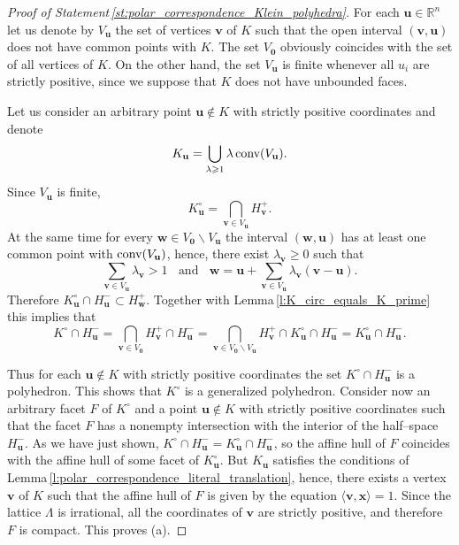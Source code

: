 \documentclass[11pt]{article}
\theoremstyle{definition}
\theoremstyle{remark}
\theoremstyle{plain}
\renewcommand{\vec}[1]{\mathbf{#1}}
\renewcommand{\geq}{\geqslant}
\newcommand{\conv}{\textup{conv}}
\newcommand{\La}{\Lambda}
\newcommand{\R}{\mathbb{R}}
\begin{document}
  \begin{proof}[Proof of Statement\,\ref{st:polar_correspondence_Klein_polyhedra}]
    For each $\vec u\in\R^n$ let us denote by $V_{\vec u}$ the set of vertices $\vec v$ of
    $K$ such that the open interval $(\vec v,\vec u)$ does not have common points with $K$.
    The set $V_{\vec 0}$ obviously coincides with the set of all vertices of $K$. On the
    other hand, the set $V_{\vec u}$ is finite whenever all $u_i$ are strictly positive,
    since we suppose that $K$ does not have unbounded faces.

    Let us consider an arbitrary point $\vec u\notin K$ with strictly positive coordinates
    and denote
    \[ K_{\vec u}=\bigcup_{\lambda\geq 1}\lambda\,\conv(V_{\vec u}). \]
    Since $V_{\vec u}$ is finite,
    \[ K_{\vec u}^\circ=\bigcap_{\vec v\in V_{\vec u}}H_{\vec v}^+. \]
    At the same time for every $\vec w\in V_{\vec 0}\backslash V_{\vec u}$ the interval
    $(\vec w,\vec u)$ has at least one common point with $\conv(V_{\vec u})$, hence, there
    exist $\lambda_{\vec v}\geq 0$ such that
    \[ \sum_{\vec v\in V_{\vec u}}\lambda_{\vec v}>1\ \ \ \ \text{and}\ \ \ \
       \vec w=\vec u+\sum_{\vec v\in V_{\vec u}}\lambda_{\vec v}(\vec v-\vec u). \]
    Therefore $ K_{\vec u}^\circ\cap H_{\vec u}^-\subset H_{\vec w}^+$. Together with
    Lemma\,\ref{l:K_circ_equals_K_prime} this implies that
    \[ K^\circ\cap H_{\vec u}^-=
       \bigcap_{\vec v\in V_{\vec 0}}H_{\vec v}^+\cap H_{\vec u}^-=
       \bigcap_{\vec v\in V_{\vec 0}\backslash V_{\vec u}}H_{\vec v}^+\cap
       K_{\vec u}^\circ\cap H_{\vec u}^-=
       K_{\vec u}^\circ\cap H_{\vec u}^-. \]

    Thus for each $\vec u\notin K$ with strictly positive coordinates the set
    $K^\circ\cap H_{\vec u}^-$ is a polyhedron. This shows that $K^\circ$ is a generalized
    polyhedron. Consider now an arbitrary facet $F$ of $K^\circ$ and a point $\vec u\notin K$
    with strictly positive coordinates such that the facet $F$ has a nonempty intersection
    with the interior of the half--space $H_{\vec u}^-$. As we have just shown,
    $K^\circ\cap H_{\vec u}^-=K_{\vec u}^\circ\cap H_{\vec u}^-$, so the affine hull of $F$
    coincides with the affine hull of some facet of $K_{\vec u}^\circ$. But $K_{\vec u}$
    satisfies the conditions of Lemma\,\ref{l:polar_correspondence_literal_translation},
    hence, there exists a vertex $\vec v$ of $K$ such that the affine hull of $F$ is given by
    the equation $\langle\vec v,\vec x\rangle=1$. Since the lattice $\La$ is irrational, all
    the coordinates of $\vec v$ are strictly positive, and therefore $F$ is compact. This
    proves (a).


\end{proof}
\end{document}
